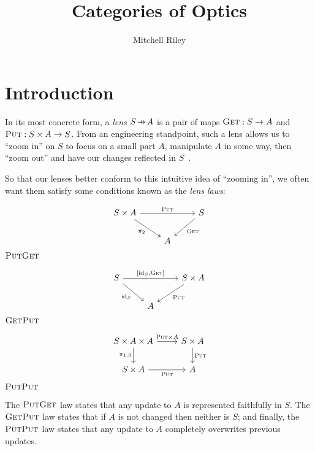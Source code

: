 \documentclass[11pt,letterpaper]{article}
\title{Categories of Optics}
\author{Mitchell Riley}
\affil{Wesleyan University \\ \texttt{mvriley@wesleyan.edu}}
\theoremstyle{plain}
\theoremstyle{definition}
\newcommand{\id}{\mathrm{id}}
\newcommand{\fget}{\textsc{Get}}
\newcommand{\fput}{\textsc{Put}}
\newcommand{\hto}{\ensuremath{\,\mathaccent\shortmid\rightarrow\,}}
\begin{document}
\maketitle

\section{Introduction}

In its most concrete form, a \emph{lens} $S \hto A$ is a pair of maps ${\fget : S \to A}$ and ${\fput : S \times A \to S}$. From an engineering standpoint, such a lens allows us to ``zoom in'' on $S$ to focus on a small part $A$, manipulate $A$ in some way, then ``zoom out'' and have our changes reflected in $S$~\cite{CombinatorsForBidirectionalTreeTransformations}.

So that our lenses better conform to this intuitive idea of ``zooming in'', we often want them satisfy some conditions known as the \emph{lens laws}:
\begin{center}
\begin{minipage}[b]{0.33333\textwidth}
\begin{center}
\[ 
\begin{tikzcd}
S \times A \ar[rr, "\fput"] \ar[dr, "\pi_2", swap] && S \ar[dl, "\fget"] \\
& A
\end{tikzcd}
\]
\hspace{0.8cm}$\fput\fget$
\end{center}
\end{minipage}%
\begin{minipage}[b]{0.33333\textwidth}
\begin{center}
\[ 
\begin{tikzcd}
S \ar[rr, "{[\id_S, \fget]}"] \ar[dr, "\id_S", swap] && S \times A \ar[dl, "\fput"] \\
& A
\end{tikzcd}
\]
\hspace{-0.6cm}$\fget\fput$
\end{center}
\end{minipage}%
\begin{minipage}[b]{0.33333\textwidth}
\begin{center}
\[ 
\begin{tikzcd}
S \times A \times A \ar[r, "\fput \times A"] \ar[d, "\pi_{1, 3}", swap] & S \times A\ar[d, "\fput"] \\
S \times A \ar[r, "\fput", swap] & A
\end{tikzcd}
\]
\quad$\fput\fput$
\end{center}
\end{minipage}%
\end{center}
The $\fput\fget$ law states that any update to $A$ is represented faithfully in $S$. The $\fget\fput$ law states that if $A$ is not changed then neither is $S$; and finally, the $\fput\fput$ law states that any update to $A$ completely overwrites previous updates.
\end{document}
